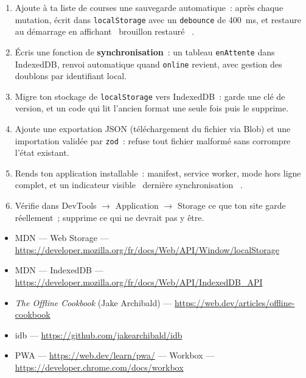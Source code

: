 \documentclass[12pt,a4paper,twoside,openright]{book}
\begin{document}
\begin{exercice}
\begin{enumerate}
  \item Ajoute \`a ta liste de courses une sauvegarde automatique~: apr\`es chaque mutation,
        \'ecrit dans \verb|localStorage| avec un \verb|debounce| de 400~ms, et restaure au
        d\'emarrage en affichant \og ~brouillon restaur\'e~ \fg{}.
  \item \'Ecris une fonction de \textbf{synchronisation}~: un tableau \verb|enAttente| dans
        IndexedDB, renvoi automatique quand \verb|online| revient, avec gestion des doublons
        par identifiant local.
  \item Migre ton stockage de \verb|localStorage| vers IndexedDB~: garde une cl\'e de version,
        et un code qui lit l'ancien format une seule fois puis le supprime.
  \item Ajoute une exportation JSON (t\'el\'echargement du fichier via Blob) et une importation
        valid\'ee par \verb|zod|~: refuse tout fichier malform\'e sans corrompre l'\'etat existant.
    \item Rends ton application installable~: manifest, service worker, mode hors ligne
        complet, et un indicateur visible \og ~derni\`ere synchronisation~ \fg{}.
  \item V\'erifie dans DevTools $\rightarrow$ Application $\rightarrow$ Storage ce que ton site
        garde r\'eellement~; supprime ce qui ne devrait pas y \^etre.
\end{enumerate}
\end{exercice}

\begin{ressources}
\begin{itemize}
  \item MDN --- Web Storage --- \url{https://developer.mozilla.org/fr/docs/Web/API/Window/localStorage}
  \item MDN --- IndexedDB --- \url{https://developer.mozilla.org/fr/docs/Web/API/IndexedDB_API}
  \item \emph{The Offline Cookbook} (Jake Archibald) --- \url{https://web.dev/articles/offline-cookbook}
  \item idb --- \url{https://github.com/jakearchibald/idb}
  \item PWA --- \url{https://web.dev/learn/pwa/} --- Workbox --- \url{https://developer.chrome.com/docs/workbox}
\end{itemize}
\end{ressources}
\end{document}
